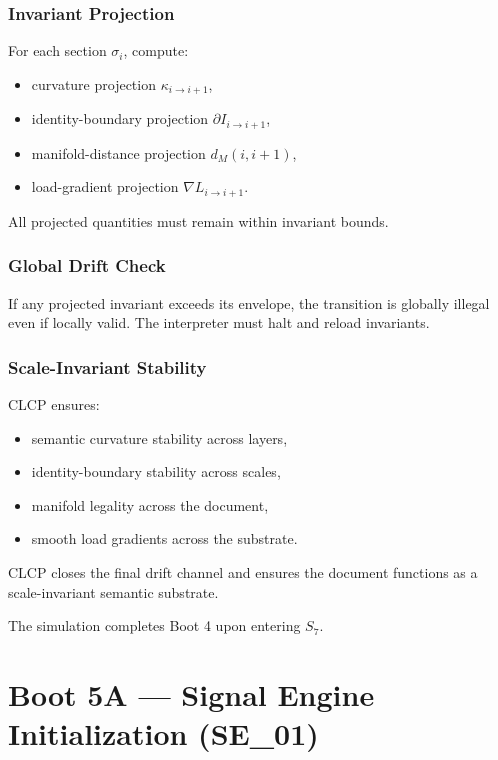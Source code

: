 \subsubsection*{Invariant Projection}

For each section $\sigma_i$, compute:
\begin{itemize}[leftmargin=1.2cm]
    \item curvature projection $\kappa_{i \rightarrow i+1}$,
    \item identity-boundary projection $\partial I_{i \rightarrow i+1}$,
    \item manifold-distance projection $d_M(i,i+1)$,
    \item load-gradient projection $\nabla L_{i \rightarrow i+1}$.
\end{itemize}

All projected quantities must remain within invariant bounds.

\subsubsection*{Global Drift Check}

If any projected invariant exceeds its envelope, the transition is globally
illegal even if locally valid. The interpreter must halt and reload invariants.

\subsubsection*{Scale-Invariant Stability}

CLCP ensures:
\begin{itemize}[leftmargin=1.2cm]
    \item semantic curvature stability across layers,
    \item identity-boundary stability across scales,
    \item manifold legality across the document,
    \item smooth load gradients across the substrate.
\end{itemize}

CLCP closes the final drift channel and ensures the document functions as a
scale-invariant semantic substrate.

\medskip
\noindent
The simulation completes Boot 4 upon entering $S_7$.

\section*{Boot 5A — Signal Engine Initialization (SE\_01)}

